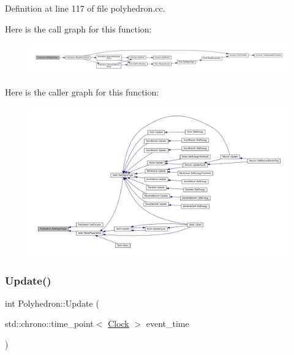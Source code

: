 Definition at line 117 of file polyhedron.\+cc.

Here is the call graph for this function\+:
\nopagebreak
\begin{figure}[H]
\begin{center}
\leavevmode
\includegraphics[width=350pt]{class_polyhedron_a014c8f981aef5fa1d70dcb5be6a0875a_cgraph}
\end{center}
\end{figure}
Here is the caller graph for this function\+:
\nopagebreak
\begin{figure}[H]
\begin{center}
\leavevmode
\includegraphics[width=350pt]{class_polyhedron_a014c8f981aef5fa1d70dcb5be6a0875a_icgraph}
\end{center}
\end{figure}
\mbox{\label{class_polyhedron_a5fdc8c91719799904b8a1ccef535a42c}} 
\subsubsection{\texorpdfstring{Update()}{Update()}}
{\footnotesize\ttfamily int Polyhedron\+::\+Update (\begin{DoxyParamCaption}\item[{std\+::chrono\+::time\+\_\+point$<$ \hyperlink{universe_8h_a0ef8d951d1ca5ab3cfaf7ab4c7a6fd80}{Clock} $>$}]{event\+\_\+time }\end{DoxyParamCaption})}



